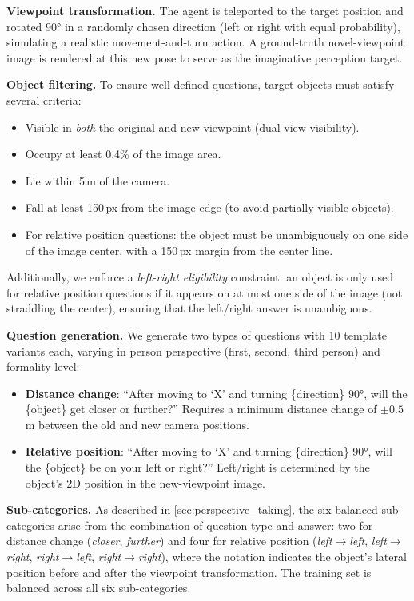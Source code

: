 \documentclass{llmxive}
\begin{document}
\noindent\textbf{Viewpoint transformation.}
The agent is teleported to the target position and rotated $90°$ in a randomly chosen direction (left or right with equal probability), simulating a realistic movement-and-turn action.
A ground-truth novel-viewpoint image is rendered at this new pose to serve as the imaginative perception target.

\noindent\textbf{Object filtering.}
To ensure well-defined questions, target objects must satisfy several criteria:
\begin{itemize}
    \item Visible in \emph{both} the original and new viewpoint (dual-view visibility).
    \item Occupy at least 0.4\% of the image area.
    \item Lie within 5\,m of the camera.
    \item Fall at least 150\,px from the image edge (to avoid partially visible objects).
    \item For relative position questions: the object must be unambiguously on one side of the image center, with a 150\,px margin from the center line.
\end{itemize}
Additionally, we enforce a \emph{left-right eligibility} constraint: an object is only used for relative position questions if it appears on at most one side of the image (not straddling the center), ensuring that the left/right answer is unambiguous.

\noindent\textbf{Question generation.}
We generate two types of questions with 10 template variants each, varying in person perspective (first, second, third person) and formality level:
\begin{itemize}
    \item \textbf{Distance change}: ``After moving to `X' and turning \{direction\} $90°$, will the \{object\} get closer or further?'' Requires a minimum distance change of $\pm0.5$\,m between the old and new camera positions.
    \item \textbf{Relative position}: ``After moving to `X' and turning \{direction\} $90°$, will the \{object\} be on your left or right?'' Left/right is determined by the object's 2D position in the new-viewpoint image.
\end{itemize}

\noindent\textbf{Sub-categories.}
As described in \cref{sec:perspective_taking}, the six balanced sub-categories arise from the combination of question type and answer:
two for distance change (\emph{closer}, \emph{further}) and four for relative position (\emph{left$\to$left}, \emph{left$\to$right}, \emph{right$\to$left}, \emph{right$\to$right}), where the notation indicates the object's lateral position before and after the viewpoint transformation.
The training set is balanced across all six sub-categories.
\end{document}
